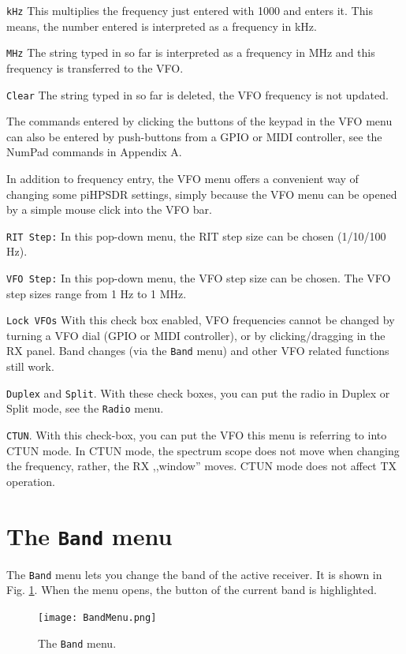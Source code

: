\documentclass[12pt]{book}
\def\rett#1{\texttt{\color{red}#1}}
\def\bltt#1{\texttt{\color{blue}#1}}
\def\pH{pi\-HPSDR\xspace}
\begin{document}
\rett{kHz} This multiplies the frequency just entered with 1000 and
enters it. This means, the number entered is interpreted as a
frequency in kHz.

\rett{MHz} The string typed in so far is interpreted as a frequency in MHz
and this frequency is transferred to the VFO.

\rett{Clear} The string typed in so far is deleted, the VFO frequency is not
updated.

The commands entered by clicking the buttons of the keypad in the VFO menu
can also be entered by push-buttons from a GPIO or MIDI controller, see
the NumPad commands in Appendix A.

In addition to frequency entry, the VFO menu offers a convenient way of changing
some \pH settings, simply because the VFO menu can be opened by a simple
mouse click into the VFO bar.

\rett{RIT Step:} In this pop-down menu, the RIT step size can be chosen (1/10/100 Hz).

\rett{VFO Step:} In this pop-down menu, the VFO step size can be chosen. The VFO step
sizes range from 1 Hz to 1 MHz.

\rett{Lock VFOs} With this check box enabled, VFO frequencies cannot be changed by
turning a VFO dial (GPIO or MIDI controller), or by clicking/dragging in the RX panel.
Band changes (via the \bltt{Band} menu) and other VFO related functions still work.

\rett{Duplex} and \rett{Split}. With these check boxes, you can put the radio
in Duplex or Split mode, see the \bltt{Radio} menu.

\rett{CTUN}. With this check-box, you can put the VFO this menu is referring to into
CTUN mode. In CTUN mode, the spectrum scope does not move when changing the frequency,
rather, the RX ,,window'' moves. CTUN mode does not affect TX operation.

\section{The \texttt{Band} menu}
\label{sec:bandmenu}
The \bltt{Band} menu lets you change the band of the active receiver. It is shown
in Fig. \ref{fig:BandMenu}. When the menu opens, the button of the current band
is highlighted.

\begin{figure}[ht]
\center
\texttt{[image: BandMenu.png]}
\caption{The \bltt{Band} menu.}
\label{fig:BandMenu}
\end{figure}
\end{document}

